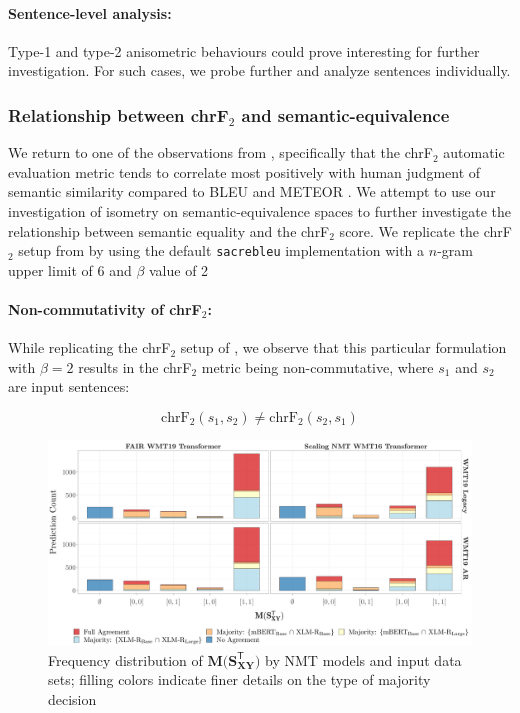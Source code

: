 \documentclass[11pt,a4paper]{article}
\begin{document}
\paragraph{Sentence-level analysis:} Type-1 and type-2 anisometric behaviours could prove interesting for further investigation. For such cases, we probe further and analyze sentences individually.

\subsubsection{Relationship between chrF$_2$ and semantic-equivalence}

We return to one of the observations from \citet{michel2019evaluation}, specifically that the chrF$_2$ automatic evaluation metric \cite{popovic2015chrf} tends to correlate most positively with human judgment of semantic similarity compared to BLEU \cite{papineni2002bleu} and METEOR \cite{denkowski2014meteor}. We attempt to use our investigation of isometry on semantic-equivalence spaces to further investigate the relationship between semantic equality and the chrF$_2$ score. We replicate the chrF$_2$ setup from \citet{michel2019evaluation} by using the default \texttt{sacrebleu} implementation \cite{post-2018-call} with a $n$-gram upper limit of 6 and $\beta$ value of 2

\paragraph{Non-commutativity of chrF$_2$:} While replicating the chrF$_2$ setup of \citet{michel2019evaluation}, we observe that this particular formulation with $\beta = 2$ results in the chrF$_2$ metric being non-commutative, where $s_1$ and $s_2$ are input sentences:

\begin{equation}
  \text{chrF}_{2}(s_1,s_2) \neq \text{chrF}_{2}(s_2,s_1)
\end{equation}

\begin{figure}
  \centering 
  \includegraphics[trim={0cm 0cm 0cm 0cm},clip,width=\textwidth]{paraphrase_detection_joint_decision.pdf}
  \caption{Frequency distribution of $\mathbf{M(S_{XY}^{\mathsf{T}}})$ by NMT models and input data sets; filling colors indicate finer details on the type of majority decision}
  \label{paraphrase_detection_joint_decision}
\end{figure}
\end{document}
